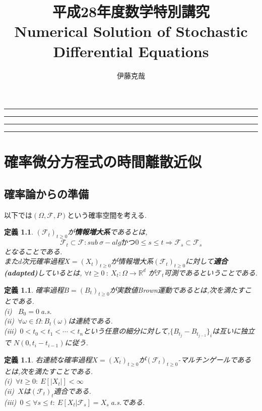 \documentclass[a4paper,dvipdfmx]{jreport}
\title{平成28年度数学特別講究\\Numerical Solution of Stochastic Differential Equations}
\author{伊藤克哉}
\makeatletter
\numberwithin{equation}{section}
\newtheorem{Def}     [Thm]{定義}
\renewenvironment{leftbar}{%
  \def\FrameCommand{\vrule width 1pt \hspace{10pt}}%
  \MakeFramed {\advance\hsize-\width \FrameRestore}}%
 {\endMakeFramed}
\def\R{\mathbb R}
\def\F{\mathcal F}
\def\defb{\begin{leftbar}\begin{Def}}
\def\defx{\end{Def}\end{leftbar}}
\renewcommand{\maketitle}{\begin{titlepage}%
    \let\footnotesize\small
    \let\footnoterule\relax
    \parindent \z@
    \reset@font
    \null
    \vskip 50\p@
    \begin{center}
      \hrule height 1pt
      \vskip 2pt 
      \hrule
      \vskip 3pt
      {\huge \bfseries \strut \@title \strut}\par
      \vskip 2pt
      \hrule
      \vskip 2pt
      \hrule height 1pt
    \end{center}
    \vskip 50\p@
    \begin{flushright}
      \Large \@author \par
    \end{flushright}
    \vfil
    \null
    \begin{flushright}
        {\small \@date}%
    \end{flushright}
  \end{titlepage}%
  \setcounter{footnote}{0}%
}
\makeatother
\begin{document}
\maketitle
\tableofcontents

\chapter{確率微分方程式の時間離散近似}
\section{確率論からの準備}
以下では$(\Omega,\F,P)$という確率空間を考える.
\defb
$(\F_t)_{t\ge0}$が{\bf 情報増大系}であるとは,
\[
\F_t \subset \F : sub\ \sigma-alg \mbox{かつ} 0\le s \le t \Rightarrow \F_s \subset \F_s
\]
となることである.\\
また$d$次元確率過程$X=(X_t)_{t\ge 0}$が情報増大系$(\F_t)_{t\ge0}$に対して{\bf 適合(adapted)}しているとは,
$\forall t \ge 0 \ : \ X_t:\Omega \to \R^d$ が$\F_t$可測であるということである.
\defx

\defb
確率過程$B=(B_t)_{t\ge 0}$が実数値Brown運動であるとは,次を満たすことである.\\
(i) \ $B_0 = 0 \  $a.s.\\
(ii)\ $\forall \omega \in \Omega:B_t(\omega)$は連続である.\\
(iii)\ $0 < t_0 < t_1 < \cdots < t_n $という任意の細分に対して,$\{B_{t_j} - B_{t_{j-1}}\}_{i}$は互いに独立で
$N(0,t_i-t_{i-1})$に従う.
\defx

\defb
右連続な確率過程$X=(X_t)_{t\ge 0}$が$(\F_t)_{t\ge 0}$-マルチンゲールであるとは,次を満たすことである.\\
(i)\ $\forall t \ge 0:\ E[|X_t|] < \infty$\\
(ii)\ $X$は$(\F_t)_t$適合である.\\
(iii)\ $0\le \forall s \le t:\ E[X_t|\F_s] = X_s\ $a.s.である.
\defx
\end{document}
